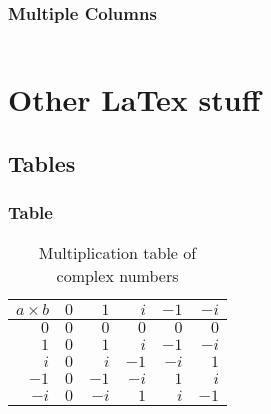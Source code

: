 \documentclass[aspectratio=169]{beamer}
\begin{document}
\begin{frame}
\frametitle{Multiple Columns}
\begin{columns}[c]



\end{columns}
\end{frame}



\section{Other LaTex stuff}

\subsection{Tables}


\begin{frame}
\frametitle{Table}


\begin{table}
\caption{Multiplication table of complex numbers}
\begin{tabular}{r | r r r r r}
$a \times b$ & $0$ &  $1$ &  $i$ & $-1$ & $-i$ \\ \hline
         $0$ & $0$ &  $0$ &  $0$ &  $0$ &  $0$ \\
         $1$ & $0$ &  $1$ &  $i$ & $-1$ & $-i$ \\
         $i$ & $0$ &  $i$ & $-1$ & $-i$ &  $1$ \\
        $-1$ & $0$ & $-1$ & $-i$ &  $1$ &  $i$ \\
        $-i$ & $0$ & $-i$ &  $1$ &  $i$ & $-1$ \\
\end{tabular}
\end{table}
\end{frame}
\end{document}
